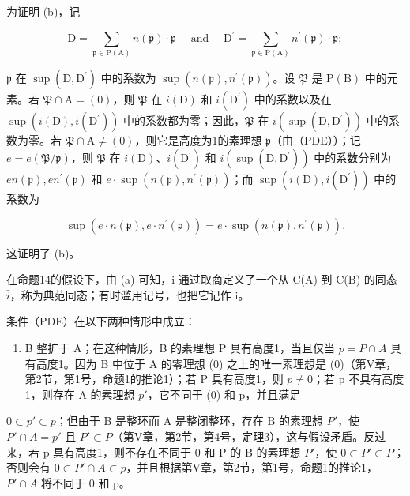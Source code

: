 为证明 (b)，记

\[
\mathrm{D} = \sum_ {\mathfrak {p} \in \mathrm{P} (\mathrm{A})} n (\mathfrak {p}) \cdot \mathfrak {p} \quad \text { and } \quad \mathrm{D} ^ {\prime} = \sum_ {\mathfrak {p} \in \mathrm{P} (\mathrm{A})} n ^ {\prime} (\mathfrak {p}) \cdot \mathfrak {p};
\]

\(\mathfrak{p}\) 在 \(\sup (\mathrm{D},\mathrm{D}^{\prime})\) 中的系数为 \(\sup (n(\mathfrak{p}),n^{\prime}(\mathfrak{p}))\)。设 \(\mathfrak{P}\) 是 \(\mathrm{P(B)}\) 中的元素。若 \(\mathfrak{P}\cap \mathrm{A} = (0)\)，则 \(\mathfrak{P}\) 在 \(i(\mathrm{D})\) 和 \(i(\mathrm{D}^{\prime})\) 中的系数以及在 \(\sup (i(\mathrm{D}),i(\mathrm{D}^{\prime}))\) 中的系数都为零；因此，\(\mathfrak{P}\) 在 \(i(\sup (\mathrm{D},\mathrm{D}^{\prime}))\) 中的系数为零。若 \(\mathfrak{P}\cap \mathrm{A}\neq (0)\)，则它是高度为1的素理想 \(\mathfrak{p}\)（由（PDE））；记 \(e = e(\mathfrak{P} / \mathfrak{p})\)，则 \(\mathfrak{P}\) 在 \(i(\mathrm{D})\)、\(i(\mathrm{D}^{\prime})\) 和 \(i(\sup (\mathrm{D},\mathrm{D}^{\prime}))\) 中的系数分别为 \(en(\mathfrak{p}),en^{\prime}(\mathfrak{p})\) 和 \(e \cdot\sup (n(\mathfrak{p}),n^{\prime}(\mathfrak{p}))\)；而 \(\sup (i(\mathrm{D}),i(\mathrm{D}^{\prime}))\) 中的系数为

\[
\sup (e \cdot n (\mathfrak {p}), e \cdot n ^ {\prime} (\mathfrak {p})) = e \cdot \sup (n (\mathfrak {p}), n ^ {\prime} (\mathfrak {p})).
\]

这证明了 (b)。

在命题14的假设下，由 (a) 可知，i 通过取商定义了一个从 C(A) 到 C(B) 的同态 \(\bar{i}\)，称为典范同态；有时滥用记号，也把它记作 i。

条件（PDE）在以下两种情形中成立：

\begin{enumerate}
\def\labelenumi{(\arabic{enumi})}
\tightlist
\item
  B 整扩于 A；在这种情形，B 的素理想 P 具有高度1，当且仅当 \(p = P \cap A\) 具有高度1。因为 B 中位于 A 的零理想 (0) 之上的唯一素理想是 (0)（第V章，第2节，第1号，命题1的推论1）；若 P 具有高度1，则 \(p \neq 0\)；若 p 不具有高度1，则存在 A 的素理想 \(p'\)，它不同于 (0) 和 p，并且满足
\end{enumerate}

\(0 \subset p' \subset p\)；但由于 B 是整环而 A 是整闭整环，存在 B 的素理想 \(P'\)，使 \(P' \cap A = p'\) 且 \(P' \subset P\)（第V章，第2节，第4号，定理3），这与假设矛盾。反过来，若 p 具有高度1，则不存在不同于 0 和 P 的 B 的素理想 \(P'\)，使 \(0 \subset P' \subset P\)；否则会有 \(0 \subset P' \cap A \subset p\)，并且根据第V章，第2节，第1号，命题1的推论1，\(P' \cap A\) 将不同于 0 和 p。

